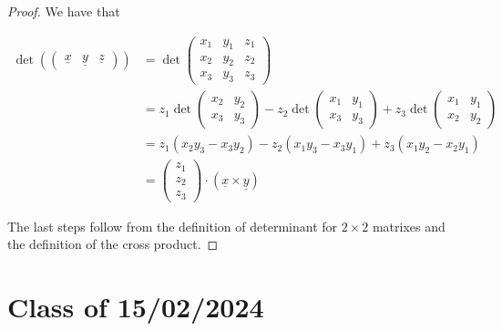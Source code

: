 \documentclass[10pt]{extarticle}
\begin{document}
\begin{proof}
    We have that

    \begin{align*}
        \det \left( \begin{pmatrix}
                            \underline{x} & \underline{y} & \underline{z}
                        \end{pmatrix} \right)
         & = \det \begin{pmatrix}
                      x_1 & y_1 & z_1 \\
                      x_2 & y_2 & z_2 \\
                      x_3 & y_3 & z_3
                  \end{pmatrix}                                                        \\
         & = z_1 \det \begin{pmatrix}
                          x_2 & y_2 \\
                          x_3 & y_3
                      \end{pmatrix}
        - z_2 \det \begin{pmatrix}
                       x_1 & y_1 \\
                       x_3 & y_3
                   \end{pmatrix}
        + z_3 \det \begin{pmatrix}
                       x_1 & y_1 \\
                       x_2 & y_2
                   \end{pmatrix}                                                        \\
         & = z_1 (x_2 y_3 - x_3 y_2) - z_2 (x_1 y_3 - x_3 y_1) + z_3 (x_1 y_2 - x_2 y_1) \\
         & = \begin{pmatrix}
                 z_1 \\ z_2 \\ z_3
             \end{pmatrix} \cdot (\underline{x} \times \underline{y})
    \end{align*}

    The last steps follow from the definition of determinant for $2 \times 2$ matrixes and the definition of the cross product.
\end{proof}

\section{Class of 15/02/2024}
\end{document}
